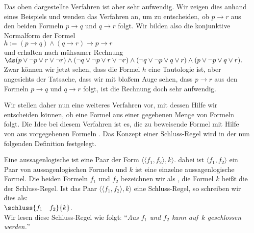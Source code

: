 Das oben dargestellte Verfahren ist aber sehr aufwendig.  Wir zeigen dies anhand eines
Beispiels und wenden das Verfahren
an, um zu entscheiden, ob $p \rightarrow r$ aus den beiden Formeln $p \rightarrow q$ und
$q \rightarrow r$ folgt.   Wir bilden also die konjunktive Normalform der Formel 
\\[0.2cm]
\hspace*{1.3cm}
$h := (p \rightarrow q) \wedge (q \rightarrow r) \rightarrow p \rightarrow r$
\\[0.2cm]
und erhalten nach mühsamer Rechnung
\\[0.2cm]
\hspace*{1.3cm}
$\ds (p \vee \neg p \vee r \vee \neg r) \wedge (\neg q \vee \neg p \vee r \vee \neg r) \wedge
     (\neg q \vee \neg p \vee q \vee r) \wedge (p \vee \neg p \vee q \vee r).
$
\\[0.2cm]
Zwar können wir jetzt sehen, dass die Formel $h$ eine Tautologie ist, aber angesichts der
Tatsache, dass wir mit bloßem Auge sehen, dass  $p \rightarrow r$ aus den Formeln $p \rightarrow q$ und
$q \rightarrow r$ folgt, ist die Rechnung  doch  sehr aufwendig.

Wir stellen daher nun eine weiteres Verfahren vor, mit dessen Hilfe wir entscheiden
können, ob eine Formel aus einer gegebenen Menge von Formeln folgt.  Die Idee bei diesem Verfahren
ist es, die zu beweisende Formel mit Hilfe von  aus vorgegebenen Formeln 
.  Das Konzept einer Schluss-Regel wird in der nun folgenden Definition
festgelegt. 
\begin{Definition}
    Eine aussagenlogische  ist eine Paar der Form  $\bigl\langle \langle f_1, f_2 \rangle, k \bigr\rangle$.
    dabei ist  $\langle f_1, f_2 \rangle$ ein Paar von aussagenlogischen Formeln und $k$ ist eine
    einzelne aussagenlogische Formel.  
    Die beiden Formeln $f_1$ und $f_2$ bezeichnen wir als
    , die Formel $k$ heißt die  der Schluss-Regel.
    Ist das Paar $\bigl\langle \langle f_1, f_2 \rangle, k \bigr\rangle$ eine Schluss-Regel, so
    schreiben wir dies als: 
    \\[0.3cm]
    \hspace*{1.3cm}      
    $\schluss{f_1 \quad f_2}{k}$.
    \\[0.3cm]
    Wir lesen diese Schluss-Regel wie folgt: 
    ``\textsl{Aus $f_1$ und $f_2$ kann auf\, $k$ geschlossen werden.}''
    \eox
\end{Definition}
\vspace*{0.3cm}

